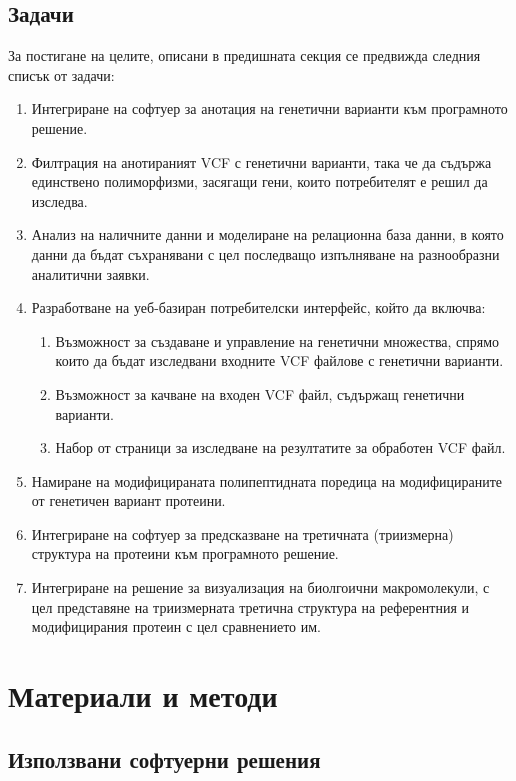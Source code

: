\documentclass[pdftex,cyrillic,14pt,a4page,twoside,openright]{extreport}
\begin{document}
\section{Задачи}
За постигане на целите, описани в предишната секция се предвижда следния списък от задачи:
\begin{enumerate}
	\item Интегриране на софтуер за анотация на генетични варианти към програмното решение.
	\item Филтрация на анотираният VCF с генетични варианти, така че да съдържа единствено полиморфизми, засягащи гени, които потребителят е решил да изследва.
	\item Анализ на наличните данни и моделиране на релационна база данни, в която данни да бъдат съхранявани с цел последващо изпълняване на разнообразни аналитични заявки.
	\item Разработване на уеб-базиран потребителски интерфейс, който да включва:
		\begin{enumerate}
			\item Възможност за създаване и управление на генетични множества, спрямо които да бъдат изследвани входните VCF файлове с генетични варианти.
			\item Възможност за качване на входен VCF файл, съдържащ генетични варианти.
			\item Набор от страници за изследване на резултатите за обработен VCF файл.
		\end{enumerate}
	\item Намиране на модифицираната полипептидната поредица на модифицираните от генетичен вариант протеини.
	\item Интегриране на софтуер за предсказване на третичната (триизмерна) структура на протеини към програмното решение.
	\item Интегриране на решение за визуализация на биолгоични макромолекули, с цел представяне на триизмерната третична структура на референтния и модифицирания протеин с цел сравнението им.
\end{enumerate}

\chapter{Материали и методи}

\section{Използвани софтуерни решения}
\end{document}
